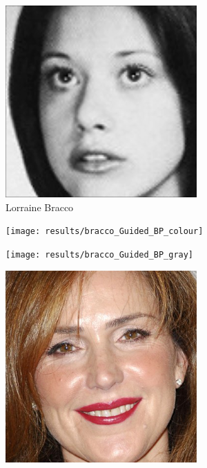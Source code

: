 \documentclass{article}
\begin{document}
\begin{figure}
	\begin{subfigure}[t]{0.33\linewidth}
		\includegraphics[width=\linewidth]{most_bracco}
		\caption{Lorraine Bracco}
	\end{subfigure}
	\begin{subfigure}[t]{0.33\linewidth}
		\texttt{[image: results/bracco\_Guided\_BP\_colour]}
	\end{subfigure}
	\begin{subfigure}[t]{0.33\linewidth}
		\texttt{[image: results/bracco\_Guided\_BP\_gray]}
	\end{subfigure}\vspace{1em}
	\begin{subfigure}[t]{0.33\linewidth}
		\includegraphics[width=\linewidth]{most_gilpin}

\end{subfigure}
\end{figure}
\end{document}
